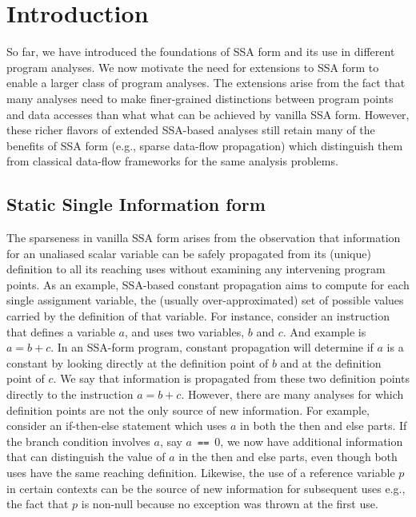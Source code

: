 \chapter{Introduction }


So far, we have introduced the foundations of SSA form and its use in different program analyses. 
We now motivate the need for extensions to SSA form to enable a larger class of program analyses. 
The extensions arise from the fact that many analyses need to make finer-grained distinctions between program points and data accesses than what what can be achieved by vanilla SSA form. 
However, these richer flavors of extended SSA-based analyses still retain many of the benefits of SSA form (e.g., sparse data-flow propagation) which distinguish them from classical data-flow frameworks for the same analysis problems.


\section{Static Single Information form}
The sparseness in vanilla SSA form arises from the observation that information for an unaliased scalar variable can be safely propagated from its (unique) definition to all its reaching uses without examining any intervening program points. 
As an example, SSA-based constant propagation aims to compute for each single assignment variable, the (usually over-approximated) set of possible values carried by the definition of that variable. 
For instance, consider an instruction that defines a variable $a$, and uses two variables, $b$ and $c$. 
And example is $a = b + c$. 
In an SSA-form program, constant propagation will determine if $a$ is a constant by looking directly at the definition point of $b$ and at the definition point of $c$. 
We say that information is propagated from these two definition points directly to the instruction $a = b + c$.
However, there are many analyses for which definition points are not the only source of new information. 
For example, consider an if-then-else statement which uses $a$ in both the then and else parts. 
If the branch condition involves $a$, say $a$~{\tt ==}~0, we now have additional information that can distinguish the value of $a$ in the then and else parts, even though both uses have the same reaching definition. 
Likewise, the use of a reference variable $p$ in certain contexts can be the source of new information for subsequent uses e.g., the fact that $p$ is non-null because no exception was thrown at the first use.


